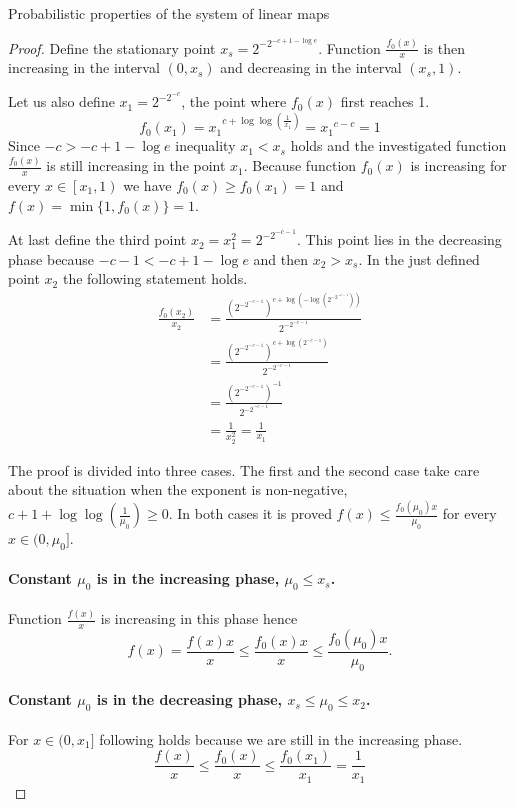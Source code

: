 \begin{section}{Probabilistic properties of the system of linear maps}
\begin{proof}
Define the stationary point $x_s = 2 ^ {-2 ^ {-c + 1 - \log e}}$. Function $\frac{f_0(x)}{x}$ is then increasing in the interval $(0, x_s)$ and decreasing in the interval $(x_s, 1)$. 

Let us also define $x_1 = 2 ^ {-2 ^ {-c}}$, the point where $f_0(x)$ first reaches 1.
\[
f_0(x_1) = {x_1} ^ {c + \log \log \left(\frac{1}{x_1}\right)} = {x_1} ^ {c - c} = 1
\]
Since $-c > -c + 1 -\log e$ inequality $x_1 < x_s$ holds and the investigated function $\frac{f_0(x)}{x}$ is still increasing in the point $x_1$.
Because function $f_0(x)$ is increasing for every $x \in \left[x_1, 1\right)$ we have $f_0(x) \geq f_0(x_1) = 1$ and $f(x) = \min \{1, f_0(x)\} = 1$.

At last define the third point $x_2 = x_1 ^ 2 = 2 ^ {-2 ^ {-c - 1}}$. This point lies in the decreasing phase because $-c - 1 < -c + 1 - \log e$ and then $x_2 > x_s$. In the just defined point $x_2$ the following statement holds.
\[
\begin{split}
\frac{f_0(x_2)}{x_2} 
	& = \frac{\left(2 ^ {-2 ^ {-c - 1}}\right) ^ {c + \log \left(- \log \left(2 ^ {-2 ^ {-c - 1}}\right)\right)}}{2 ^ {-2 ^ {-c - 1}}} \\
	& = \frac{\left(2 ^ {-2 ^ {-c - 1}}\right) ^ {c + \log \left(2 ^ {-c - 1}\right)}}{2 ^ {-2 ^ {-c - 1}}} \\
	& = \frac{\left(2 ^ {-2 ^ {-c - 1}}\right) ^ {-1}}{2 ^ {-2 ^ {-c - 1}}} \\
	& = \frac{1}{x_2^2} = \frac{1}{x_1}
\end{split}
\]

The proof is divided into three cases. The first and the second case take care about the situation when the exponent is non-negative, $c + 1 + \log \log \left(\frac{1}{\mu_0}\right) \geq 0$. In both cases it is proved $f(x) \leq \frac{f_0(\mu_0)x}{\mu_0}$ for every $x \in (0, \mu_0]$.
\paragraph{Constant $\mu_0$ is in the increasing phase, $\mu_0 \leq x_s$.}
Function $\frac{f(x)}{x}$ is increasing in this phase hence
\[
f(x) = \frac{f(x)x}{x} \leq \frac{f_0(x)x}{x} \leq \frac{f_0(\mu_0)x}{\mu_0} \text{.}
\]

\paragraph{Constant $\mu_0$ is in the decreasing phase, $x_s \leq \mu_0 \leq x_2$.}
For $x \in (0, x_1]$ following holds because we are still in the increasing phase.
\[
\frac{f(x)}{x} \leq \frac{f_0(x)}{x} \leq \frac{f_0(x_1)}{x_1} = \frac{1}{x_1}
\]


\end{proof}
\end{section}
